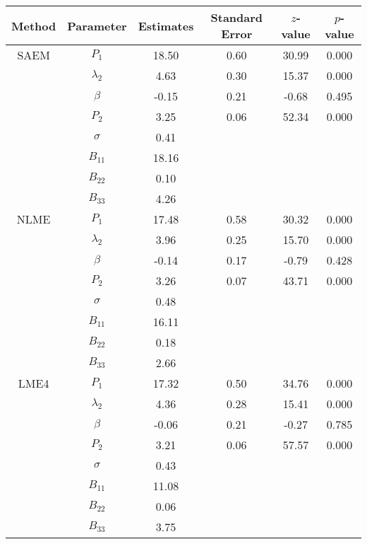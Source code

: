\begin{table}[ht]
\centering
\begin{tabular}{cccccc}
  \hline
Method & Parameter & Estimates & Standard Error & $z$-value & $p$-value \\ 
  \hline
SAEM & $P_1$ & 18.50 & 0.60 & 30.99 & 0.000 \\ 
   & $\lambda_2$ & 4.63 & 0.30 & 15.37 & 0.000 \\ 
   & $\beta$ & -0.15 & 0.21 & -0.68 & 0.495 \\ 
   & $P_2$ & 3.25 & 0.06 & 52.34 & 0.000 \\ 
   & $\sigma$ & 0.41 &  &  &  \\ 
   & $B_{11}$ & 18.16 &  &  &  \\ 
   & $B_{22}$ & 0.10 &  &  &  \\ 
   & $B_{33}$ & 4.26 &  &  &  \\ 
  NLME & $P_1$ & 17.48 & 0.58 & 30.32 & 0.000 \\ 
   & $\lambda_2$ & 3.96 & 0.25 & 15.70 & 0.000 \\ 
   & $\beta$ & -0.14 & 0.17 & -0.79 & 0.428 \\ 
   & $P_2$ & 3.26 & 0.07 & 43.71 & 0.000 \\ 
   & $\sigma$ & 0.48 &  &  &  \\ 
   & $B_{11}$ & 16.11 &  &  &  \\ 
   & $B_{22}$ & 0.18 &  &  &  \\ 
   & $B_{33}$ & 2.66 &  &  &  \\ 
  LME4 & $P_1$ & 17.32 & 0.50 & 34.76 & 0.000 \\ 
   & $\lambda_2$ & 4.36 & 0.28 & 15.41 & 0.000 \\ 
   & $\beta$ & -0.06 & 0.21 & -0.27 & 0.785 \\ 
   & $P_2$ & 3.21 & 0.06 & 57.57 & 0.000 \\ 
   & $\sigma$ & 0.43 &  &  &  \\ 
   & $B_{11}$ & 11.08 &  &  &  \\ 
   & $B_{22}$ & 0.06 &  &  &  \\ 
   & $B_{33}$ & 3.75 &  &  &  \\ 
   \hline
\end{tabular}
\end{table}
